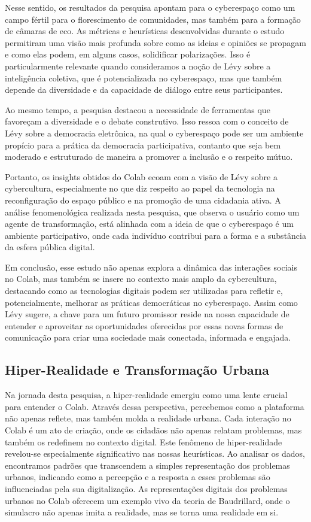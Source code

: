Nesse sentido, os resultados da pesquisa apontam para o cyberespaço como um campo fértil para o florescimento de comunidades, mas também para a formação de câmaras de eco. As métricas e heurísticas desenvolvidas durante o estudo permitiram uma visão mais profunda sobre como as ideias e opiniões se propagam e como elas podem, em alguns casos, solidificar polarizações. Isso é particularmente relevante quando consideramos a noção de Lévy sobre a inteligência coletiva, que é potencializada no cyberespaço, mas que também depende da diversidade e da capacidade de diálogo entre seus participantes.

Ao mesmo tempo, a pesquisa destacou a necessidade de ferramentas que favoreçam a diversidade e o debate construtivo. Isso ressoa com o conceito de Lévy sobre a democracia eletrônica, na qual o cyberespaço pode ser um ambiente propício para a prática da democracia participativa, contanto que seja bem moderado e estruturado de maneira a promover a inclusão e o respeito mútuo.

Portanto, os insights obtidos do Colab ecoam com a visão de Lévy sobre a cybercultura, especialmente no que diz respeito ao papel da tecnologia na reconfiguração do espaço público e na promoção de uma cidadania ativa. A análise fenomenológica realizada nesta pesquisa, que observa o usuário como um agente de transformação, está alinhada com a ideia de que o cyberespaço é um ambiente participativo, onde cada indivíduo contribui para a forma e a substância da esfera pública digital.

Em conclusão, esse estudo não apenas explora a dinâmica das interações sociais no Colab, mas também se insere no contexto mais amplo da cybercultura, destacando como as tecnologias digitais podem ser utilizadas para refletir e, potencialmente, melhorar as práticas democráticas no cyberespaço. Assim como Lévy sugere, a chave para um futuro promissor reside na nossa capacidade de entender e aproveitar as oportunidades oferecidas por essas novas formas de comunicação para criar uma sociedade mais conectada, informada e engajada.

\subsection*{Hiper-Realidade e Transformação Urbana}

Na jornada desta pesquisa, a hiper-realidade emergiu como uma lente crucial para entender o Colab. Através dessa perspectiva, percebemos como a plataforma não apenas reflete, mas também molda a realidade urbana. Cada interação no Colab é um ato de criação, onde os cidadãos não apenas relatam problemas, mas também os redefinem no contexto digital. Este fenômeno de hiper-realidade revelou-se especialmente significativo nas nossas heurísticas. Ao analisar os dados, encontramos padrões que transcendem a simples representação dos problemas urbanos, indicando como a percepção e a resposta a esses problemas são influenciadas pela sua digitalização. As representações digitais dos problemas urbanos no Colab oferecem um exemplo vivo da teoria de Baudrillard, onde o simulacro não apenas imita a realidade, mas se torna uma realidade em si.

